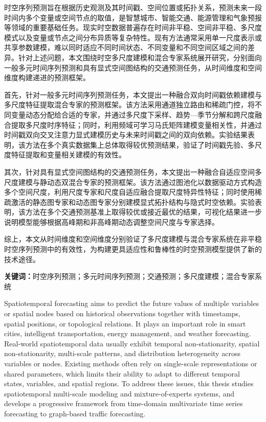 \cleardoublepage
{}

时空序列预测旨在根据历史观测及其时间戳、空间位置或拓扑关系，预测未来一段时间内多个变量或空间节点的取值，是智慧城市、智能交通、能源管理和气象预报等领域的重要基础任务。现实时空数据普遍存在时间非平稳、空间非平稳、多尺度模式以及变量或节点之间分布异质等复杂特性。现有方法通常采用单一尺度表示或共享参数建模，难以同时适应不同时间状态、不同变量和不同空间区域之间的差异。针对上述问题，本文围绕时空多尺度建模和混合专家系统展开研究，分别面向一般多元时间序列预测和具有显式空间图结构的交通预测任务，从时间维度和空间维度构建递进的预测框架。

首先，针对一般多元时间序列预测任务，本文提出一种融合双向时间戳依赖建模与多尺度特征提取混合专家的预测框架。该方法采用通道独立路由和稀疏门控，将不同变量动态分配给合适的专家，并通过多尺度下采样、趋势—季节分解和跨尺度融合提取多尺度时序特征；同时，利用频域可学习马氏矩阵建模变量相关性，并通过时间戳双向交叉注意力显式建模历史与未来时间戳之间的双向依赖。实验结果表明，该方法在多个真实数据集上总体取得较优预测结果，验证了时间戳先验、多尺度特征提取和变量相关建模的有效性。

其次，针对具有显式空间图结构的交通预测任务，本文提出一种融合自适应空间多尺度建模与静动态双混合专家的预测框架。该方法通过图池化以数据驱动方式构造多个空间尺度，利用尺度专家和尺度自适应融合提取尺度特异性特征；同时使用稀疏激活的静态图专家和动态图专家分别建模显式拓扑结构与隐式时空依赖。实验表明，该方法在多个交通预测基准上取得较优或接近最优的结果，可视化结果进一步说明模型能够根据高峰期和非高峰期动态调整空间尺度与专家选择。

综上，本文从时间维度和空间维度分别验证了多尺度建模与混合专家系统在非平稳时空序列预测中的有效性，为构建更具适应性和鲁棒性的时空预测模型提供了新的技术途径。

\textbf{关键词：}时空序列预测；多元时间序列预测；交通预测；多尺度建模；混合专家系统

\cleardoublepage
{}

Spatiotemporal forecasting aims to predict the future values of multiple variables or spatial nodes based on historical observations together with timestamps, spatial positions, or topological relations. It plays an important role in smart cities, intelligent transportation, energy management, and weather forecasting. Real-world spatiotemporal data usually exhibit temporal non-stationarity, spatial non-stationarity, multi-scale patterns, and distribution heterogeneity across variables or nodes. Existing methods often rely on single-scale representations or shared parameters, which limits their ability to adapt to different temporal states, variables, and spatial regions. To address these issues, this thesis studies spatiotemporal multi-scale modeling and mixture-of-experts systems, and develops a progressive framework from time-domain multivariate time series forecasting to graph-based traffic forecasting.

